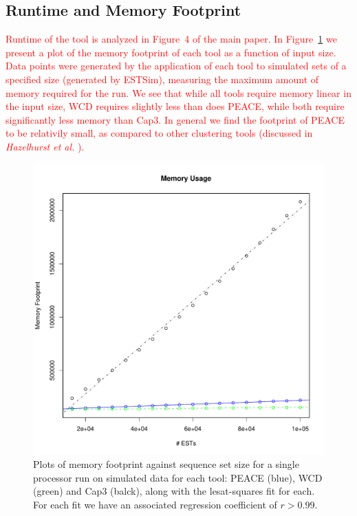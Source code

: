 \documentclass[a4paper,12pt]{article}
\newcommand{\mc}[1]{\textcolor{red}{#1}}
\newcommand{\peace} {{\small PEACE}}
\newcommand{\wcd} {{\small WCD}}
\newcommand{\capthree} {{\small Cap3}}
\begin{document}
\begin{appendix}
\subsection{Runtime and Memory Footprint}

\mc{Runtime of the tool is analyzed in Figure~4 of the main paper.  In
Figure~\ref{memory} we present a plot of the memory footprint of each tool
as a function of input size.  Data points were generated by the application of
each tool to simulated sets of a specified size (generated by ESTSim),
measuring the maximum amount of memory required for the run.  We see that while
all tools require memory linear in the input size, \wcd\/ requires
slightly less than does \peace, while both require significantly less
memory than \capthree.  In general we find the footprint of \peace\/
to be relativily small, as compared to other clustering tools
(discussed in {\it Hazelhurst et al.} \cite{Hazelhurst08a}).}

\begin{figure}[tbp]
\centerline{
\includegraphics[scale=0.35]{pics.d/memory.pdf}
}
\caption{Plots of memory footprint against sequence set size for a
  single processor run on simulated data for each tool: \peace\/
  (blue), \wcd\/ (green) and \capthree\/ (balck), along with the
  lesat-squares fit for each.  For each fit we have an associated
  regression coefficient of $r > 0.99$.}\label{memory}
\end{figure}


\end{appendix}
\end{document}
